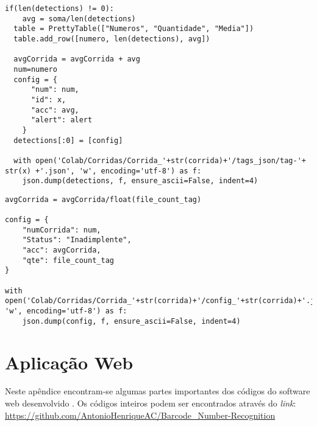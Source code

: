 \begin{lstlisting}[caption=Identificando os números nas imagens com \textit{barcodes} individuais, label=ap:identNumber]
  if(len(detections) != 0):
    avg = soma/len(detections)
  table = PrettyTable(["Numeros", "Quantidade", "Media"])
  table.add_row([numero, len(detections), avg])
  
  avgCorrida = avgCorrida + avg
  num=numero
  config = {
      "num": num,
      "id": x,
      "acc": avg,
      "alert": alert
    }
  detections[:0] = [config]

  with open('Colab/Corridas/Corrida_'+str(corrida)+'/tags_json/tag-'+ str(x) +'.json', 'w', encoding='utf-8') as f:
    json.dump(detections, f, ensure_ascii=False, indent=4)
\end{lstlisting}


\newpage

\begin{lstlisting}[caption=Criando o arquivo config-x.json]
avgCorrida = avgCorrida/float(file_count_tag)

config = {
    "numCorrida": num,
    "Status": "Inadimplente",
    "acc": avgCorrida,
    "qte": file_count_tag
}

with open('Colab/Corridas/Corrida_'+str(corrida)+'/config_'+str(corrida)+'.json', 'w', encoding='utf-8') as f:
    json.dump(config, f, ensure_ascii=False, indent=4)
\end{lstlisting}


\newpage

\chapter{Aplicação Web} \label{ap:web}

Neste apêndice encontram-se algumas partes importantes dos códigos do software web desenvolvido . Os códigos inteiros podem ser encontrados através do \textit{link}: \url{https://github.com/AntonioHenriqueAC/Barcode_Number-Recognition}
\newline



